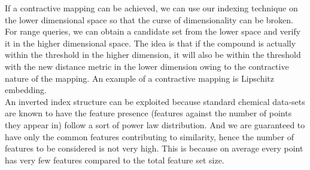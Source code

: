 If a contractive mapping can be achieved, we can use our indexing technique on the lower dimensional space so that the curse of dimensionality can be broken. For range queries, we can obtain a candidate set from the lower space and verify it in the higher dimensional space. The idea is that if the compound is actually within the threshold in the higher dimension, it will also be within the threshold with the new distance metric in the lower dimension owing to the contractive nature of the mapping. An example of a contractive mapping is Lipschitz embedding.\\

An inverted index structure can be exploited because standard chemical data-sets are known to have the feature presence (features against the number of points they appear in) follow a sort of power law distribution. And we are guaranteed to have only the common features contributing to similarity, hence the number of features to be considered is not very high. This is because on average every point has very few features compared to the total feature set size.\\
